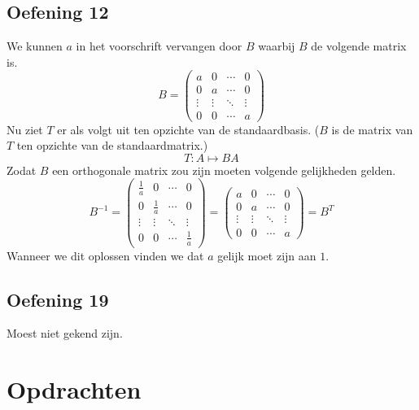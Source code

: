 \documentclass[lineaire_algebra_oplossingen.tex]{subfiles}
\begin{document}
\subsection{Oefening 12}
We kunnen $a$ in het voorschrift vervangen door $B$ waarbij $B$ de volgende matrix is.
\[
B=
\begin{pmatrix}
a & 0 & \cdots & 0\\
0 & a & \cdots & 0\\
\vdots & \vdots& \ddots & \vdots\\
0 & 0 & \cdots & a
\end{pmatrix}
\]
Nu ziet $T$ er als volgt uit ten opzichte van de standaardbasis. ($B$ is de matrix van $T$ ten opzichte van de standaardmatrix.)
\[
T: A \mapsto BA
\]
Zodat $B$ een orthogonale matrix zou zijn moeten volgende gelijkheden gelden.
\[
B^{-1}=
\begin{pmatrix}
\frac{1}{a} & 0 & \cdots & 0\\
0 & \frac{1}{a} & \cdots & 0\\
\vdots & \vdots& \ddots & \vdots\\
0 & 0 & \cdots & \frac{1}{a}
\end{pmatrix}
=
\begin{pmatrix}
a & 0 & \cdots & 0\\
0 & a & \cdots & 0\\
\vdots & \vdots& \ddots & \vdots\\
0 & 0 & \cdots & a
\end{pmatrix}
= B^T
\]
Wanneer we dit oplossen vinden we dat $a$ gelijk moet zijn aan $1$.


\subsection{Oefening 19}
Moest niet gekend zijn.


\section{Opdrachten}
\end{document}
